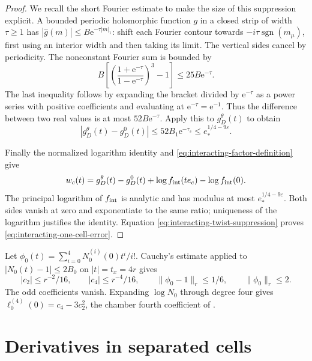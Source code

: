 \begin{proof}
We recall the short Fourier estimate to make the
size of this suppression explicit. A bounded
periodic holomorphic function $g$ in a closed
strip of width $\tau\ge1$ has
$|\widehat g(m)|\le B \mathrm e^{-\tau|m|_1}$:
shift each Fourier contour towards
$-i\tau\operatorname{sgn}(m_\mu)$, first using
an interior width and then taking its limit.
The vertical sides cancel by periodicity.
The nonconstant Fourier sum is bounded by
\[
 B\left[\left(\frac{1+\mathrm e^{-\tau}}{1-\mathrm e^{-\tau}}\right)^3-1\right]
                                      \le25B\mathrm e^{-\tau}.
\]
The last inequality follows by expanding the
bracket divided by $\mathrm e^{-\tau}$ as a power
series with positive coefficients and evaluating
at $\mathrm e^{-\tau}=\mathrm e^{-1}$. Thus the difference
between two real values is at most $52B\mathrm e^{-\tau}$.
Apply this to $g_D^\theta(t)$ to obtain
\begin{equation}\label{eq:interacting-twist-suppression}
 |g_D^\theta(t)-g_D^0(t)|\le52B_1\mathrm e^{-\tau_s}
                                  \le e_*^{1/4-9\varepsilon}.
\end{equation}

Finally the normalized logarithm identity and
\eqref{eq:interacting-factor-definition} give
\[
 w_c(t)=g_D^\theta(t)-g_D^0(t)
                +\log f_{\rm int}(te_c)-\log f_{\rm int}(0).
\]
The principal logarithm of $f_{\rm int}$ is
analytic and has modulus at most
$e_*^{1/4-9\varepsilon}$. Both sides vanish
at zero and exponentiate to the same ratio;
uniqueness of the logarithm justifies the
identity. Equation
\eqref{eq:interacting-twist-suppression} proves
\eqref{eq:interacting-one-cell-error}.
\end{proof}

Let $\phi_0(t)=\sum_{i=0}^4N_0^{(i)}(0)t^i/i!$.
Cauchy's estimate applied to
$|N_0(t)-1|\le2B_0$ on $|t|=t_x=4r$ gives
\begin{equation}\label{eq:interacting-free-jet}
 |c_2|\le r^{-2}/16,\qquad |c_4|\le r^{-4}/16,\qquad
 \|\phi_0-1\|_r\le1/6,\qquad \|\phi_0\|_r\le2.
\end{equation}
The odd coefficients vanish. Expanding $\log N_0$
through degree four gives
$\ell_0^{(4)}(0)=c_4-3c_2^2$, the chamber fourth coefficient
of \cite[Theorem~B]{PositiveProbe}.

\section{Derivatives in separated cells}
\label{subsec:interacting-separated}

